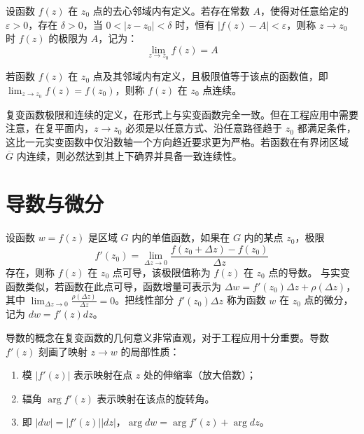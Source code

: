 \begin{definition}[复变函数的极限]
设函数 \(f(z)\) 在 \(z_0\) 点的去心邻域内有定义。若存在常数 \(A\)，使得对任意给定的 \(\varepsilon > 0\)，存在 \(\delta > 0\)，当 \(0 < |z - z_0| < \delta\) 时，恒有 \(|f(z) - A| < \varepsilon\)，则称 \(z \to z_0\) 时 \(f(z)\) 的极限为 \(A\)，记为：
\[
\lim_{z \to z_0} f(z) = A
\]
\end{definition}

\begin{definition}[连续性]
若函数 \(f(z)\) 在 \(z_0\) 点及其邻域内有定义，且极限值等于该点的函数值，即 \(\lim_{z \to z_0} f(z) = f(z_0)\)，则称 \(f(z)\) 在 \(z_0\) 点连续。
\end{definition}

\begin{remark}
复变函数极限和连续的定义，在形式上与实变函数完全一致。但在工程应用中需要注意，在复平面内，\(z \to z_0\) 必须是以任意方式、沿任意路径趋于 \(z_0\) 都满足条件，这比一元实变函数中仅沿数轴一个方向趋近要求更为严格。若函数在有界闭区域 \(\overline{G}\) 内连续，则必然达到其上下确界并具备一致连续性。
\end{remark}

\section{导数与微分}

\begin{definition}[可导与微分]
设函数 \(w = f(z)\) 是区域 \(G\) 内的单值函数，如果在 \(G\) 内的某点 \(z_0\)，极限
\[
f'(z_0) = \lim_{\Delta z \to 0} \frac{f(z_0 + \Delta z) - f(z_0)}{\Delta z}
\]
存在，则称 \(f(z)\) 在 \(z_0\) 点可导，该极限值称为 \(f(z)\) 在 \(z_0\) 点的导数。
与实变函数类似，若函数在此点可导，函数增量可表示为 \(\Delta w = f'(z_0)\Delta z + \rho(\Delta z)\)，其中 \(\lim_{\Delta z \to 0} \frac{\rho(\Delta z)}{\Delta z} = 0\)。把线性部分 \(f'(z_0)\Delta z\) 称为函数 \(w\) 在 \(z_0\) 点的微分，记为 \(dw = f'(z) dz\)。
\end{definition}

\begin{remark}
导数的概念在复变函数的几何意义非常直观，对于工程应用十分重要。导数 \(f'(z)\) 刻画了映射 \(z \to w\) 的局部性质：
\begin{enumerate}
    \item 模 \(|f'(z)|\) 表示映射在点 \(z\) 处的伸缩率（放大倍数）；
    \item 辐角 \(\arg f'(z)\) 表示映射在该点的旋转角。
    \item 即 \(|dw| = |f'(z)||dz|\)，\(\arg dw = \arg f'(z) + \arg dz\)。
\end{enumerate}
\end{remark}

